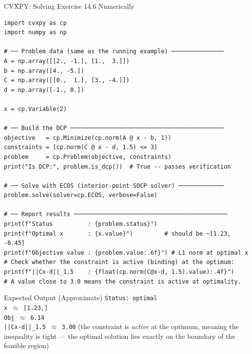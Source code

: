 \documentclass[aspectratio=169,10pt]{beamer}
\begin{document}
\begin{frame}[fragile]{CVXPY: Solving Exercise 14.6 Numerically}
\begin{lstlisting}[caption={Numerical solution of the mixed-norm problem (Ex.\ 14.6) with full reporting}]
import cvxpy as cp
import numpy as np

# ── Problem data (same as the running example) ───────────────
A = np.array([[2., -1.], [1.,  3.]])
b = np.array([4., -5.])
C = np.array([[0.,  1.], [3., -4.]])
d = np.array([-1., 0.])

x = cp.Variable(2)

# ── Build the DCP ────────────────────────────────────────────
objective   = cp.Minimize(cp.norm(A @ x - b, 1))
constraints = [cp.norm(C @ x - d, 1.5) <= 3]
problem     = cp.Problem(objective, constraints)
print("Is DCP:", problem.is_dcp())  # True -- passes verification

# ── Solve with ECOS (interior-point SOCP solver) ─────────────
problem.solve(solver=cp.ECOS, verbose=False)

# ── Report results ────────────────────────────────────────────
print(f"Status          : {problem.status}")
print(f"Optimal x       : {x.value}")         # should be ~[1.23, -0.45]
print(f"Objective value : {problem.value:.6f}") # L1 norm at optimal x
# Check whether the constraint is active (binding) at the optimum:
print(f"||Cx-d||_1.5    : {float(cp.norm(C@x-d, 1.5).value):.4f}")
# A value close to 3.0 means the constraint is active at optimality.
\end{lstlisting}
  \begin{block}{Expected Output (Approximate)}
    \texttt{Status: optimal}\\
    \texttt{x $\approx$ [1.23,]}\\
    \texttt{Obj $\approx$ 6.14}\\
    \texttt{||Cx-d||\_1.5 $\approx$ 3.00}
    (the constraint is \emph{active} at the optimum, meaning the
    inequality is tight --- the optimal solution lies exactly on the
    boundary of the feasible region)
  \end{block}
\end{frame}
\end{document}
